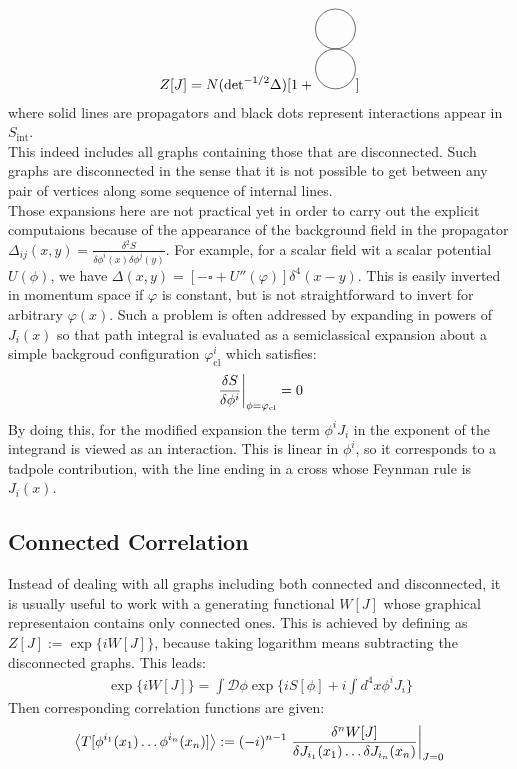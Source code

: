 \begin{align}
    Z[J] = N (\text{det}^{-1/2} \Delta)[ 1+
    \begin{tikzpicture}
        \draw (0,0) circle (0.5);
        \draw (0,-1) circle (0.5);
    \end{tikzpicture}
    ]
\end{align}
where solid lines are propagators and black dots represent interactions appear in $S_{\text{int}}$. \\ This indeed includes all graphs containing those that are disconnected. Such graphs are disconnected in the sense that it is not possible to get between any pair of vertices along some sequence of internal lines. \\
\indent Those expansions here are not practical yet in order to carry out the explicit computaions because of the appearance of the background field in the propagator $\Delta _{ij}(x,y) = \frac{\delta^{2}S}{\delta \phi ^{i}(x) \delta \phi ^{j}(y)}$. For example, for a scalar field wit a scalar potential $U(\phi)$, we have $\Delta(x,y) = [-\square + U'' (\varphi)]\delta ^{4} (x-y)$. This is easily inverted in momentum space if $\varphi$ is constant, but is not straightforward to invert for arbitrary $\varphi(x)$. Such a problem is often addressed by expanding in powers of $J_{i}(x)$ so that path integral is evaluated as a semiclassical expansion about a simple backgroud configuration $\varphi _{\text{cl}}^{i}$ which satisfies:
\begin{align}
    \eval{\fdv{S}{\phi ^{i}}}_{\phi = \varphi _{\text{cl}}} = 0
\end{align}
By doing this, for the modified expansion the term $\phi^{i} J_{i}$ in the exponent of the integrand is viewed as an interaction. This is linear in $\phi ^{i}$, so it corresponds to a tadpole contribution, with the line ending in a cross whose Feynman rule is $J_{i}(x)$.

\subsection{Connected Correlation}
Instead of dealing with all graphs including both connected and disconnected, it is usually useful to work with a generating functional $W[J]$ whose graphical representaion contains only connected ones. This is achieved by defining as $Z[J] := \exp \lbrace iW[J] \rbrace$, because taking logarithm means subtracting the disconnected graphs. This leads:
\begin{align}
    \label{eq:W}
    \exp \lbrace iW[J] \rbrace = \int \mathcal{D} \phi \exp \lbrace iS[\phi] + i\int d^{4}x \phi ^{i} J_{i} \rbrace 
\end{align}
Then corresponding correlation functions are given:
\begin{align}
    \expval{T[\phi ^{i_{1}}(x_{1}) \dots \phi ^{i_{n}}(x_{n}) ]} := (-i)^{n-1} \eval{\frac{\delta ^{n}W[J]}{\delta J_{i_{1}}(x_{1}) \dots \delta J_{i_{n}}(x_{n})}} _{J=0}
\end{align}

